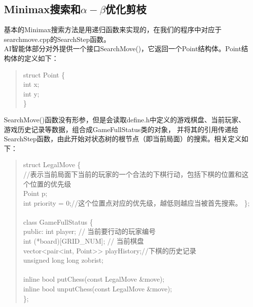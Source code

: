 \documentclass{acm_proc_article-sp}
\begin{document}
\subsection{\textbf{Minimax搜索和$\alpha-\beta$优化剪枝}}
基本的Minimax搜索方法是用递归函数来实现的，在我们的程序中对应于searchmove.cpp的SearchStep函数。\\
AI智能体部分对外提供一个接口SearchMove()，它返回一个Point结构体。Point结构体的定义如下：
\begin{quote}
       struct Point \{\\
       \hspace*{0.6cm} int x;\\
       \hspace*{0.6cm} int y;\\
       \}
\end{quote}
SearchMove()函数没有形参，但是会读取define.h中定义的游戏棋盘、当前玩家、游戏历史记录等数据，组合成GameFullStatus类的对象，
并将其的引用传递给SearchStep函数，由此开始对状态树的根节点（即当前局面）的搜索。相关定义如下：
\begin{quote}
       struct LegalMove \{\\
       \hspace*{0.6cm} //表示当前局面下当前的玩家的一个合法的下棋行动，包括下棋的位置和这个位置的优先级\\
       \hspace*{0.6cm} Point p;\\
       \hspace*{0.6cm} int priority = 0;//这个位置点对应的优先级，越低则越应当被首先搜索。
       \};\\
       \\
       class GameFullStatus \{\\
       public:
       \hspace*{0.6cm} int player; // 当前要行动的玩家编号\\
       \hspace*{0.6cm} int (*board)[GRID_NUM]; // 当前棋盘\\
       \hspace*{0.6cm} vector<pair<int, Point>> playHistory;//下棋的历史记录\\
       \hspace*{0.6cm} unsigned long long zobrist;\\
       \\
       \hspace*{0.6cm}inline bool putChess(const LegalMove &move);\\
       \hspace*{0.6cm}inline bool unputChess(const LegalMove &move);\\
       \};
\end{quote}
\end{document}

